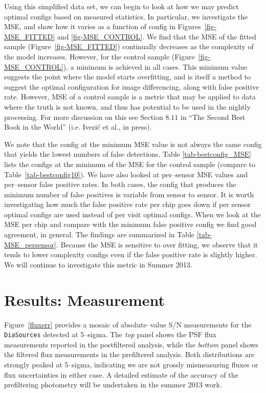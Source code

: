 \documentclass[prd, nofootinbib, floatfix, 11pt,tightenlines,times]{article}
\begin{document}
Using this simplified data set, we can begin to look at how we may predict 
optimal configs based on measured statistics.  In particular, we investigate
the MSE, and show how it varies as a function of config in Figures~\ref{fig-MSE_FITTED} and \ref{fig-MSE_CONTROL}.
We find that the MSE of the fitted sample (Figure~\ref{fig-MSE_FITTED}) continually decreases as the complexity 
of the model increases.  However, for the control sample (Figure~\ref{fig-MSE_CONTROL}), a minimum is achieved in all cases.
This minimum value suggests the point where the model starts overfitting, and is itself a method
to suggest the optimal configuration for image differencing, along with false positive rate.
However, MSE of a control sample is a metric that may be applied to data where the truth is not known, and thus has
potential to be used in the nightly processing.
For more discussion on this see Section $8.11$ in
``The Second Best Book in the World'' (i.e. {Ivezi{\'c} et al., in press}).

We note that the config at the minimum MSE value is
not always the same config that yields the lowest numbers of false detections.  
Table \ref{tab-bestconfig_MSE} lists the configs
at the minimum of the MSE for the control sample (compare to Table~\ref{tab-bestconfig10}).
%
We have also 
looked at per--sensor MSE values and per--sensor false positive rates.  In both cases, 
the config that produces the minimum number of false positives is variable
from sensor to sensor.  It is worth investigating how much the false positive rate
per chip goes down if per sensor optimal configs are used instead of per visit optimal
configs.
%
When we look at the MSE per chip and compare with the minimum false positive config we 
find good agreement, in general.  The findings are summarized in Table \ref{tab-MSE_persensor}.  Because
the MSE is sensitive to over fitting, we observe that it tends to lower complexity configs
even if the false positive rate is slightly higher.  We will continue to investigate this metric
in Summer 2013.

\section{Results: Measurement}

Figure~\ref{fluxerr} provides a mosaic of absolute--value S/N
measurements for the {\tt DiaSources} detected at 5--sigma.  The {\it
  top} panel shows the PSF flux measurements reported in the
postfiltered analysis, while the {\it bottom} panel shows the filtered
flux measurements in the prefiltered analysis.  Both distributions are
strongly peaked at 5--sigma, indicating we are not grossly
mismeasuring fluxes or flux uncertainties in either case. A detailed
estimate of the accuracy of the prefiltering photometry will be
undertaken in the summer 2013 work.
\end{document}
